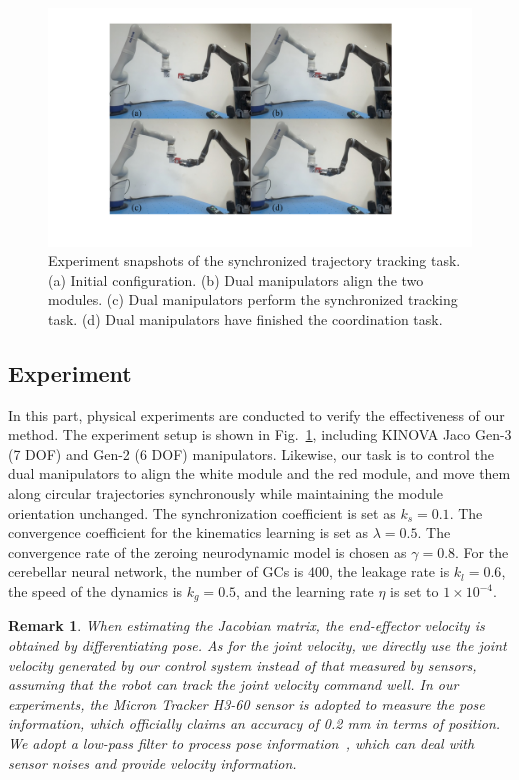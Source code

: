 \documentclass[journal,twoside,web]{ieeecolor}
\newtheorem{remark}{Remark}
\begin{document}
\begin{figure}[!t]
    \centering
    \includegraphics[width=0.9\linewidth]{figures/experiment/FIG8_TII-24-5492.pdf}
    \caption{Experiment snapshots of the synchronized trajectory tracking task. (a) Initial configuration. (b) Dual manipulators align the two modules. (c) Dual manipulators perform the synchronized tracking task. (d) Dual manipulators have finished the coordination task.
    }
    \label{Fig:exp:snapshots}
\end{figure}


\subsection{Experiment}


In this part, physical experiments are conducted to verify the effectiveness of our method. The experiment setup is shown in Fig.~\ref{Fig:exp:snapshots}, including KINOVA Jaco Gen-3 (7 DOF) and Gen-2 (6 DOF) manipulators. Likewise, our task is to control the dual manipulators to align the white module and the red module, and move them along circular trajectories synchronously while maintaining the module orientation unchanged. The synchronization coefficient is set as $k_s= 0.1$. The convergence coefficient for the kinematics learning is set as $\lambda = 0.5$. The convergence rate of the zeroing neurodynamic model is chosen as $\gamma = 0.8$. For the cerebellar neural network, the number of GCs is $400$, the leakage rate is $k_l = 0.6$, the speed of the dynamics is $k_g = 0.5$, and the learning rate $\eta$ is set to $1\times 10^{-4}$. 

\begin{remark}
When estimating the Jacobian matrix, the end-effector velocity is obtained by differentiating pose. As for the joint velocity, we directly use the joint velocity generated by our control system instead of that measured by sensors, assuming that the robot can track the joint velocity command well. In our experiments, the Micron Tracker H3-60 sensor is adopted to measure the pose information, which officially claims an accuracy of 0.2 mm in terms of position. We adopt a low-pass filter to process pose information~\cite{Yang2020TIE}, which can deal with sensor noises and provide velocity information.
\end{remark}
\end{document}
